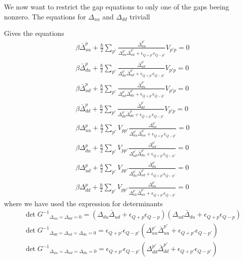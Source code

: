 \documentclass{article}
\begin{document}
We now want to restrict the gap equations to only one of the gaps beeing nonzero. The equations for $\Delta_{uu}$ and $\Delta_{dd}$ triviall

Gives the equations
\begin{align}
     &\beta{\bar{\Delta}}_{uu}^{p} + \frac{\hbar}{2} \sum_{p'} \frac{\bar{\Delta}_{uu}^{p'}}{\Delta_{uu}^{p'} \bar{\Delta}_{uu}^{p'} + \epsilon_{Q+p'} \epsilon_{Q-p'}} V_{p'p}  = 0\nonumber\\
     &\beta \bar{\Delta}_{du}^p + \frac{\hbar}{2} \sum_{p'} \frac{\bar{\Delta}_{ud}^{p'}}{\Delta_{du}^{p'} \bar{\Delta}_{ud}^{p'} + \epsilon_{Q+p'} \epsilon_{Q-p'}}  V_{p'p}  = 0\nonumber\\
     &\beta \bar{\Delta}^{p}_{ud} + \frac{\hbar}{2} \sum_{p'} \frac{\bar{\Delta}_{du}^{p'}}{\Delta_{ud}^{p'} \bar{\Delta}_{du}^{p'} + \epsilon_{Q+p'} \epsilon_{Q-p'}}  V_{p'p} = 0 \nonumber \\
     &\beta{\bar{\Delta}}_{dd}^{p} + \frac{\hbar}{2} \sum_{p'} \frac{\bar{\Delta}_{dd}^{p'}}{\Delta_{dd}^{p'} \bar{\Delta}_{dd}^{p'} + \epsilon_{Q+p'} \epsilon_{Q-p'}}  V_{p'p}  = 0\nonumber \\
     &\beta \Delta_{uu}^p + \frac{\hbar}{2} \sum_{p'} V_{pp'} \frac{\Delta^{p'}_{uu}}{\Delta^{p'}_{uu} \bar{\Delta}^{p'}_{uu} + \epsilon_{Q+p'} \epsilon_{Q-p'}} = 0\nonumber \\
     &\beta \Delta_{du}^p + \frac{\hbar}{2} \sum_{p'} V_{pp'} \frac{\Delta^{p'}_{ud}}{\Delta^{p'}_{ud} \bar{\Delta}^{p'}_{du} + \epsilon_{Q+p'} \epsilon_{Q-p'}} = 0 \nonumber \\
     &\beta \Delta_{ud}^p + \frac{\hbar}{2} \sum_{p'} V_{pp'} \frac{\Delta^{p'}_{du}}{\Delta^{p'}_{du} \bar{\Delta}^{p'}_{ud} + \epsilon_{Q+p'} \epsilon_{Q-p'}} = 0\nonumber \\
     &\beta \Delta_{dd}^p + \frac{\hbar}{2} \sum_{p'} V_{pp'} \frac{\Delta^{p'}_{uu}}{\Delta^{p'}_{uu} \bar{\Delta}^{p'}_{uu} + \epsilon_{Q+p'} \epsilon_{Q-p'}} = 0
\label{gap equations}
\end{align}
where we have used the expression for determinants
\begin{align}
&\det{G^{-1}}_{\Delta_{uu} = \Delta_{dd} = 0} = \left(\Delta_{du} \bar{\Delta}_{ud} + \epsilon_{Q+p} \epsilon_{Q-p}\right) \left(\Delta_{ud} \bar{\Delta}_{du} + \epsilon_{Q+p} \epsilon_{Q-p}\right) \nonumber \\
%
&\det{G^{-1}}_{\Delta_{dd} = \Delta_{ud}  = \Delta_{du} = 0} = \epsilon_{Q+p'} \epsilon_{Q-p'} \left( \Delta^{p'}_{uu} \bar{\Delta}^{p'}_{uu} + \epsilon_{Q+p'} \epsilon_{Q-p'}\right)\label{determinants}\\
%
&\det{G^{-1}}_{\Delta_{uu} = \Delta_{ud}  = \Delta_{du} = 0} = \epsilon_{Q+p'} \epsilon_{Q-p'} \left( \Delta^{p'}_{dd} \bar{\Delta}^{p'}_{dd} + \epsilon_{Q+p'} \epsilon_{Q-p'}\right)\nonumber
\end{align}
\end{document}
